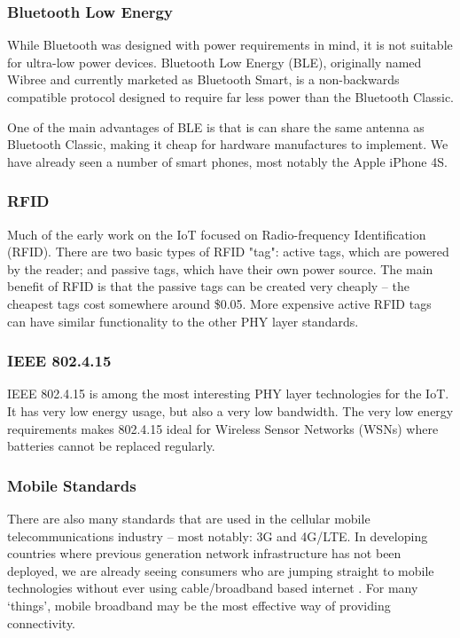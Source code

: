 \documentclass[10pt,journal,compsoc]{IEEEtran}
\begin{document}
\subsubsection{Bluetooth Low Energy}
While Bluetooth was designed with power requirements in mind, it is not
suitable for ultra-low power devices. Bluetooth Low Energy (BLE), originally
named Wibree and currently marketed as Bluetooth Smart, is a non-backwards
compatible protocol designed to require far less power than the Bluetooth
Classic. 

One of the main advantages of BLE is that is can share the same antenna as
Bluetooth Classic, making it cheap for hardware manufactures to implement. We
have already seen a number of smart phones, most notably the Apple iPhone 4S.

\subsubsection{RFID}
Much of the early work on the IoT focused on Radio-frequency Identification
(RFID). There are two basic types of RFID "tag": active tags, which are powered
by the reader; and passive tags, which have their own power source. The main
benefit of RFID is that the passive tags can be created very cheaply -- the
cheapest tags cost somewhere around \$0.05. More expensive active RFID tags can
have similar functionality to the other PHY layer standards. 

\subsubsection{IEEE 802.4.15}
IEEE 802.4.15 is among the most interesting PHY layer technologies for the IoT. It
has very low energy usage, but also a very low bandwidth. The very low energy
requirements makes 802.4.15 ideal for Wireless Sensor Networks (WSNs) where
batteries cannot be replaced regularly. 

\subsubsection{Mobile Standards}
There are also many standards that are used in the cellular mobile
telecommunications industry -- most notably: 3G and 4G/LTE. In developing
countries where previous generation network infrastructure has not been
deployed, we are already seeing consumers who are jumping straight to mobile
technologies without ever using cable/broadband based internet
\cite{Kritzinger2013}. For many `things', mobile broadband may be the most
effective way of providing connectivity.  
\end{document}
